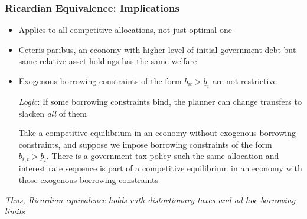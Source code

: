 \documentclass{beamer}
\begin{document}
%
%
%
%

\begin{frame}[label = back to borrowing constraints main]
 \frametitle{Ricardian Equivalence: Implications}
 \begin{itemize}
 \item Applies to all competitive allocations, not just optimal one
 \item Ceteris paribus, an economy with higher level of initial government debt  but same relative asset holdings has the same welfare
 \item Exogenous borrowing constraints of the form $b_{it}>\underline{b}_i$ are not restrictive

 \emph{Logic}: If some borrowing constraints bind, the planner can change transfers to  slacken   \emph{all}  of them
 \small
 \hyperlink{borrowing constraints}{}
\begin{theorem}
Take a competitive
equilibrium  in an economy without
exogenous borrowing constraints, and suppose we impose borrowing constraints of the form $b_{i,t}>\underbar{b}_i$.  There is a government tax policy such the same allocation and interest rate sequence is  part of a competitive equilibrium
in an economy with those exogenous borrowing constraints
\end{theorem}
\end{itemize}
\normalsize
  \color{red}\emph{Thus, Ricardian equivalence holds with distortionary taxes and ad hoc borrowing limits}

\end{frame}
\end{document}
